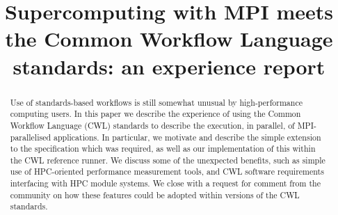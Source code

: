 \documentclass[conference]{IEEEtran}
\begin{document}
%
\title{Supercomputing with MPI meets the Common Workflow Language standards: an experience report}

\author{
\and
{}
\and
{}
}


\maketitle

\begin{abstract}
Use of standards-based workflows is still somewhat unusual by high-performance computing users. In this paper we describe the experience of using the Common Workflow Language (CWL) standards to describe the execution, in parallel, of MPI-parallelised applications. In particular, we motivate and describe the simple extension to the specification which was required, as well as our implementation of this within the CWL reference runner. We discuss some of the unexpected benefits, such as simple use of HPC-oriented performance measurement tools, and CWL software requirements interfacing with HPC module systems. We close with a request for comment from the community on how these features could be adopted within versions of the CWL standards.
\end{abstract}
\end{document}
